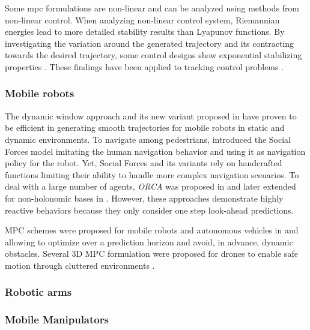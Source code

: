 Some \ac{mpc} formulations are non-linear and can be analyzed
using methods from non-linear control. When analyzing non-linear control
system, Riemannian energies lead to more detailed stability results than
Lyapunov functions. By investigating the variation around the generated
trajectory and its contracting towards the desired trajectory, some control
designs show exponential stabilizing properties \cite{l2}. These
findings have been applied to tracking control problems \cite{l3}.

\subsubsection{Mobile robots}
\label{subsub:mobile_robots}

The dynamic window approach \cite{Fox1997} and its new variant proposed in
\cite{Zhang2019} have proven to be efficient in generating smooth trajectories
for mobile robots in static and dynamic environments. To navigate among
pedestrians, \cite{Ferrer2013} introduced the Social Forces model imitating
the human navigation behavior and using it as navigation policy for the
robot.  Yet, Social Forces and its variants rely on handcrafted functions
limiting their ability to handle more complex navigation scenarios. To deal
with a large number of agents, \textit{ORCA} was proposed in
\cite{VanDenBerg2011} and later extended for non-holonomic bases in
\cite{Alonso-Mora2012a}. However, these approaches demonstrate highly reactive
behaviors because they only consider one step look-ahead predictions.

MPC schemes were proposed for mobile robots and autonomous vehicles in
\cite{Brito2019} and \cite{Schwarting2018} allowing to optimize over a
prediction horizon and avoid, in advance, dynamic obstacles.  Several 3D MPC
formulation were proposed for drones to enable safe motion through cluttered
environments \cite{Tordesillas2019,Liu2017}.

\subsubsection{Robotic arms}
\label{subsub:robotic_arms}

\subsubsection{Mobile Manipulators}
\label{subsub:mobile_manipulators}

